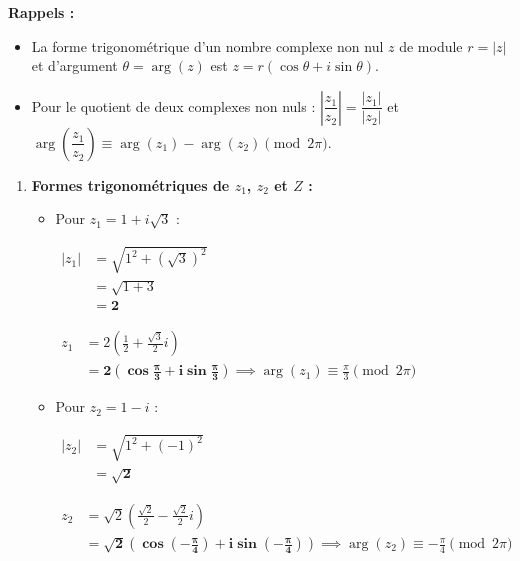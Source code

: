 \documentclass[12pt,a4paper]{article}
\begin{document}
\textbf{Rappels :} 
\begin{itemize}
    \item La forme trigonométrique d'un nombre complexe non nul $z$ de module $r = |z|$ et d'argument $\theta = \arg(z)$ est $z = r(\cos\theta + i\sin\theta)$.
    \item Pour le quotient de deux complexes non nuls : $\left|\dfrac{z_1}{z_2}\right| = \dfrac{|z_1|}{|z_2|}$ et $\arg\left(\dfrac{z_1}{z_2}\right) \equiv \arg(z_1) - \arg(z_2) \pmod{2\pi}$.
\end{itemize}

\begin{enumerate}
    \item \textbf{Formes trigonométriques de $z_1$, $z_2$ et $Z$ :}
    
    \begin{itemize}
        \item Pour $z_1 = 1 + i\sqrt{3}$ :
        
        $
        \begin{aligned}
            |z_1| &= \sqrt{1^2 + (\sqrt{3})^2}\\
            &= \sqrt{1 + 3}\\
            &= \mathbf{2}
        \end{aligned}
        $
        
        $
        \begin{aligned}
            z_1 &= 2\left(\frac{1}{2} + \frac{\sqrt{3}}{2}i\right)\\
            &= \mathbf{2\left(\cos\frac{\pi}{3} + i\sin\frac{\pi}{3}\right)} \implies \arg(z_1) \equiv \frac{\pi}{3} \pmod{2\pi}
        \end{aligned}
        $
        
        \item Pour $z_2 = 1 - i$ :
        
        $
        \begin{aligned}
            |z_2| &= \sqrt{1^2 + (-1)^2}\\
            &= \mathbf{\sqrt{2}}
        \end{aligned}
        $
        
        $
        \begin{aligned}
            z_2 &= \sqrt{2}\left(\frac{\sqrt{2}}{2} - \frac{\sqrt{2}}{2}i\right)\\
            &= \mathbf{\sqrt{2}\left(\cos\left(-\frac{\pi}{4}\right) + i\sin\left(-\frac{\pi}{4}\right)\right)} \implies \arg(z_2) \equiv -\frac{\pi}{4} \pmod{2\pi}
        \end{aligned}
        $
        

\end{itemize}
\end{enumerate}
\end{document}
